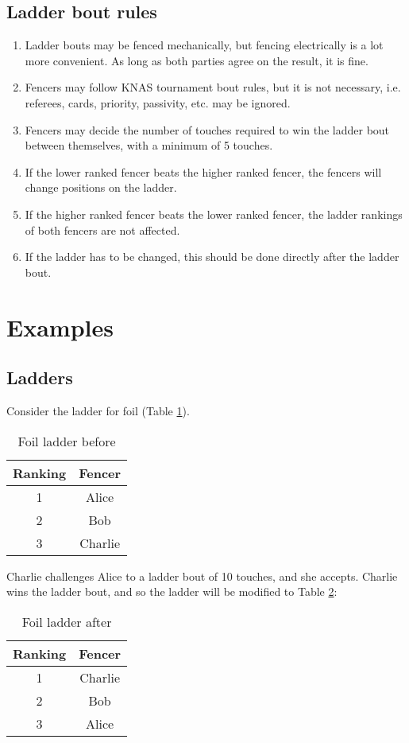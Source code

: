 \documentclass{article}
\begin{document}
\subsection{Ladder bout rules}
\begin{enumerate} 
    \item Ladder bouts may be fenced mechanically, but fencing electrically is a lot more convenient. As long as both parties agree on the result, it is fine.
    \item Fencers may follow KNAS tournament bout rules, but it is not necessary, i.e. referees, cards, priority, passivity, etc. may be ignored.
    \item Fencers may decide the number of touches required to win the ladder bout between themselves, with a minimum of 5 touches.
    \item If the lower ranked fencer beats the higher ranked fencer, the fencers will change positions on the ladder.
    \item If the higher ranked fencer beats the lower ranked fencer, the ladder rankings of both fencers are not affected.
    \item If the ladder has to be changed, this should be done directly after the ladder bout.
\end{enumerate}
\section{Examples}
\subsection{Ladders}
Consider the ladder for foil (Table \ref{tab:foil}).
\begin{table}[ht]
    \centering
    \begin{tabular}{|c|c|}
        \hline
        Ranking & Fencer \\ \hline
        1 & Alice \\ \hline
        2 & Bob \\ \hline
        3 & Charlie \\ \hline
    \end{tabular}
    \caption{Foil ladder before}
    \label{tab:foil}
\end{table}
Charlie challenges Alice to a ladder bout of 10 touches, and she accepts. Charlie wins the ladder bout, and so the ladder will be modified to Table \ref{tab:foil2}:
\begin{table}[ht]
    \centering
    \begin{tabular}{|c|c|}
        \hline
        Ranking & Fencer \\ \hline
        1 & Charlie \\ \hline
        2 & Bob \\ \hline
        3 & Alice \\ \hline
    \end{tabular}
    \caption{Foil ladder after}
    \label{tab:foil2}
\end{table}
\end{document}
